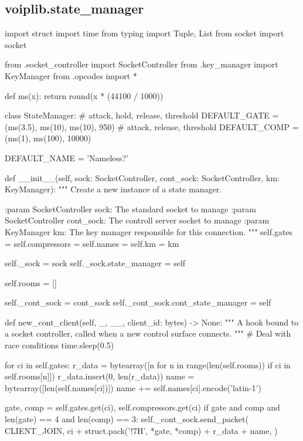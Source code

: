 \subsection{voiplib.state\_manager}
\begin{pythoncode}
import struct
import time
from typing import Tuple, List
from socket import socket

from .socket_controller import SocketController
from .key_manager import KeyManager
from .opcodes import *


def ms(x):
    return round(x * (44100 / 1000))


class StateManager:
    # attack, hold, release, threshold
    DEFAULT_GATE = (ms(3.5), ms(10), ms(10), 950)
    # attack, release, threshold
    DEFAULT_COMP = (ms(1), ms(100), 10000)

    DEFAULT_NAME = 'Nameless?'

    def __init__(self, sock: SocketController, cont_sock: SocketController,
                 km: KeyManager):
        """
        Create a new instance of a state manager.

        :param SocketController sock: The standard socket to manage
        :param SocketController cont_sock: The controll server socket to manage
        :param KeyManager km: The key manager responsible for this connection.
        """
        self.gates = {}
        self.compressors = {}
        self.names = {}
        self.km = km

        self._sock = sock
        self._sock.state_manager = self

        self.rooms = []

        self._cont_sock = cont_sock
        self._cont_sock.cont_state_manager = self

    def new_cont_client(self, _, __, client_id: bytes) -> None:
        """
        A hook bound to a socket controller, called when a new control surface
        connects.
        """
        # Deal with race conditions
        time.sleep(0.5)

        for ci in self.gates:
            r_data = bytearray([n for n in range(len(self.rooms)) if ci in self.rooms[n]])
            r_data.insert(0, len(r_data))
            name = bytearray([len(self.names[ci])])
            name += self.names[ci].encode('latin-1')

            gate, comp = self.gates.get(ci), self.compressors.get(ci)
            if gate and comp and len(gate) == 4 and len(comp) == 3:
                self._cont_sock.send_packet(
                    CLIENT_JOIN,
                    ci + struct.pack('!7H', *gate, *comp) + r_data + name,
                )


\end{pythoncode}
